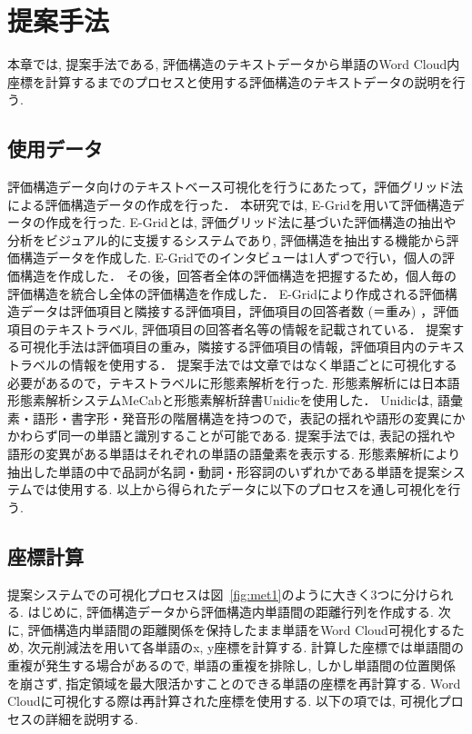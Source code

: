 \documentclass[syuuron]{kuee}
\begin{document}
\chapter{提案手法}
	本章では, 提案手法である, 評価構造のテキストデータから単語のWord Cloud内座標を計算するまでのプロセスと使用する評価構造のテキストデータの説明を行う. 
	
	\section{使用データ}
		評価構造データ向けのテキストベース可視化を行うにあたって，評価グリッド法による評価構造データの作成を行った．
		本研究では, E-Gridを用いて評価構造データの作成を行った. 
		E-Gridとは, 評価グリッド法に基づいた評価構造の抽出や分析をビジュアル的に支援するシステムであり, 
		評価構造を抽出する機能から評価構造データを作成した. 
		E-Gridでのインタビューは1人ずつで行い，個人の評価構造を作成した．
		その後，回答者全体の評価構造を把握するため，個人毎の評価構造を統合し全体の評価構造を作成した．
		E-Gridにより作成される評価構造データは評価項目と隣接する評価項目，評価項目の回答者数 (＝重み) ，評価項目のテキストラベル, 評価項目の回答者名等の情報を記載されている．
		提案する可視化手法は評価項目の重み，隣接する評価項目の情報，評価項目内のテキストラベルの情報を使用する．
		提案手法では文章ではなく単語ごとに可視化する必要があるので，テキストラベルに形態素解析を行った. 
		形態素解析には日本語形態素解析システムMeCab\cite{mcb1}と形態素解析辞書Unidicを使用した．
		Unidicは, 語彙素・語形・書字形・発音形の階層構造を持つので，表記の揺れや語形の変異にかかわらず同一の単語と識別することが可能である. 
		提案手法では, 表記の揺れや語形の変異がある単語はそれぞれの単語の語彙素を表示する. 
		形態素解析により抽出した単語の中で品詞が名詞・動詞・形容詞のいずれかである単語を提案システムでは使用する. 
		以上から得られたデータに以下のプロセスを通し可視化を行う. 
		
	\section{座標計算}
		提案システムでの可視化プロセスは図~\ref{fig:met1}のように大きく3つに分けられる. 
		はじめに, 評価構造データから評価構造内単語間の距離行列を作成する. 
		次に, 評価構造内単語間の距離関係を保持したまま単語をWord Cloud可視化するため, 次元削減法を用いて各単語のx, y座標を計算する. 
		計算した座標では単語間の重複が発生する場合があるので, 
		単語の重複を排除し, しかし単語間の位置関係を崩さず, 指定領域を最大限活かすことのできる単語の座標を再計算する. 
		Word Cloudに可視化する際は再計算された座標を使用する. 
		以下の項では, 可視化プロセスの詳細を説明する. 
		
\end{document}
